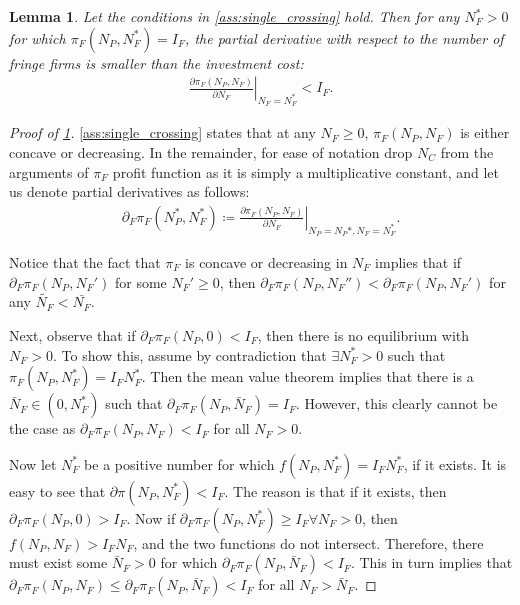 \documentclass[a4paper]{article}
\newtheorem{lemma}{Lemma}
\begin{document}
\begin{lemma}
    \label{lem:slope_at_eq}
    Let the conditions in \cref{ass:single_crossing} hold. Then for any $N_F^* > 0$ for which $\pi_F(N_P, N_F^*) = I_F$, the partial derivative with respect to the number of fringe firms is smaller than the investment cost:
    \begin{align*}
        \left. \frac{\partial \pi_F(N_P, N_F)}{\partial N_F} \right|_{N_F = N_F^*} < I_F.
    \end{align*}
\end{lemma}
\begin{proof}[Proof of \cref{lem:slope_at_eq}]
    \cref{ass:single_crossing} states that at any $N_F \geq 0$, $\pi_F(N_P, N_F)$ is either concave or decreasing.
    In the remainder, for ease of notation drop $N_C$ from the arguments of $\pi_F$ profit function as it is simply a multiplicative constant, and let us denote partial derivatives as follows:
    \begin{align*}
        \partial_F \pi_F(N_P^*, N_F^*) \coloneqq \left. \frac{\partial \pi_F(N_P, N_F)}{\partial N_F} \right|_{N_P = N_P*, N_F = N_F^*}.
    \end{align*}

    Notice that the fact that $\pi_F$ is concave or decreasing in $N_F$ implies that if $\partial_F \pi_F(N_P, N_F')$ for some $N_F' \geq 0$, then $\partial_F \pi_F(N_P, N_F'') < \partial_F \pi_F(N_P, N_F')$ for any $\tilde{N_F} < \bar{N_F}$.

    Next, observe that if $\partial_F \pi_F(N_P, 0) < I_F$, then there is no equilibrium with $N_F > 0$.
    To show this, assume by contradiction that $\exists N_F^* > 0$ such that $\pi_F(N_P, N_F^*) = I_F N_F^*$.
    Then the mean value theorem implies that there is a $\bar{N}_F \in (0, N_F^*)$ such that $\partial_F \pi_F(N_P, \bar{N}_F) = I_F$.
    However, this clearly cannot be the case as $\partial_F \pi_F(N_P, N_F) < I_F$ for all $N_F > 0$.

    Now let $N_F^*$ be a positive number for which $f(N_P, N_F^*) = I_F N_F^*$, if it exists.
    It is easy to see that $\partial \pi(N_P, N_F^*) < I_F$.
    The reason is that if it exists, then $\partial_F \pi_F(N_P, 0) > I_F$.
    Now if $\partial_F \pi_F(N_P, N_F^*) \geq I_F \forall N_F > 0$, then $f(N_P, N_F) > I_F N_F$, and the two functions do not intersect.
    Therefore, there must exist some $\bar{N}_F > 0$ for which $\partial_F \pi_F(N_P, \bar{N}_F) < I_F$.
    This in turn implies that $\partial_F \pi_F(N_P, N_F) \leq \partial_F \pi_F(N_P, \bar{N}_F) < I_F$ for all $N_F > \bar{N}_F$.
\end{proof}
\end{document}
